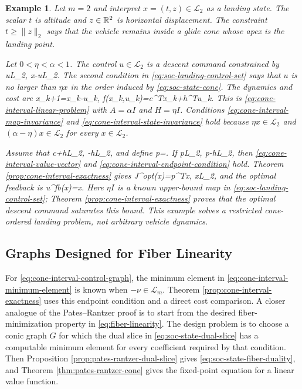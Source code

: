 \documentclass{article}
\newtheorem{example}{Example}
\begin{document}
\begin{example}
Let $m=2$ and interpret $x=(t,z)\in\mathcal L_2$ as a landing state. The scalar $t$ is altitude and $z\in\mathbb{R}^2$ is horizontal displacement. The constraint $t\geq\|z\|_2$ says that the vehicle remains inside a glide cone whose apex is the landing point.

Let $0<\eta<\alpha<1$. The control $u\in\mathcal L_2$ is a descent command constrained by
\BEQ
u\in\mathcal L_2,
\quad
\eta x-u\in\mathcal L_2.
\label{eq:soc-landing-control-set}
\EEQ
The second condition in \eqref{eq:soc-landing-control-set} says that $u$ is no larger than $\eta x$ in the order induced by \eqref{eq:soc-state-cone}. The dynamics and cost are
\BEQ
x_{k+1}=\alpha x_k-u_k,
\quad
f(x_k,u_k)=c^Tx_k+h^Tu_k.
\label{eq:soc-landing-controlled-dynamics}
\EEQ
This is \eqref{eq:cone-interval-linear-problem} with $A=\alpha I$ and $H=\eta I$. Conditions \eqref{eq:cone-interval-map-invariance} and \eqref{eq:cone-interval-state-invariance} hold because $\eta x\in\mathcal L_2$ and $(\alpha-\eta)x\in\mathcal L_2$ for every $x\in\mathcal L_2$.

Assume that
\BEQ
c+\eta h\in{}\mathcal L_2,
\quad
-h\in{}\mathcal L_2,
\label{eq:soc-landing-cost-interior}
\EEQ
and define
\BEQ
p=.
\label{eq:soc-landing-controlled-value-vector}
\EEQ
If
\BEQ
p\in\mathcal L_2,
\quad
\gamma p-h\in\mathcal L_2,
\label{eq:soc-landing-control-cost-condition}
\EEQ
then \eqref{eq:cone-interval-value-vector} and \eqref{eq:cone-interval-endpoint-condition} hold. Theorem \ref{prop:cone-interval-exactness} gives
\BEQ
J^\textrm{opt}(x)=p^Tx,
\quad x\in\mathcal L_2,
\label{eq:soc-landing-controlled-value-function}
\EEQ
and the optimal feedback is
\BEQ
u^\textrm{fb}(x)=\eta x.
\label{eq:soc-landing-feedback}
\EEQ
Here $\eta I$ is a known upper-bound map in \eqref{eq:soc-landing-control-set}; Theorem \ref{prop:cone-interval-exactness} proves that the optimal descent command saturates this bound. This example solves a restricted cone-ordered landing problem, not arbitrary vehicle dynamics.
\end{example}



\subsection{Graphs Designed for Fiber Linearity}

For \eqref{eq:cone-interval-control-graph}, the minimum element in \eqref{eq:cone-interval-minimum-element} is known when $-\nu\in\mathcal L_m$. Theorem \ref{prop:cone-interval-exactness} uses this endpoint condition and a direct cost comparison. A closer analogue of the Pates--Rantzer proof is to start from the desired fiber-minimization property in \eqref{eq:fiber-linearity}. The design problem is to choose a conic graph $G$ for which the dual slice in \eqref{eq:soc-state-dual-slice} has a computable minimum element for every coefficient required by that condition. Then Proposition \ref{prop:pates-rantzer-dual-slice} gives \eqref{eq:soc-state-fiber-duality}, and Theorem \ref{thm:pates-rantzer-cone} gives the fixed-point equation for a linear value function.
\end{document}
